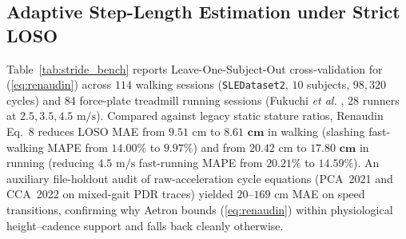 \documentclass[journal]{IEEEtran}
\begin{document}
\subsection{Adaptive Step-Length Estimation under Strict LOSO}
Table~\ref{tab:stride_bench} reports Leave-One-Subject-Out cross-validation for (\ref{eq:renaudin}) across $114$ walking sessions (\texttt{SLEDataset2}, $10$ subjects, $98{,}320$ cycles) and $84$ force-plate treadmill running sessions (Fukuchi \emph{et al.} \cite{fukuchi2017public}, $28$ runners at $2.5, 3.5, 4.5\text{ m/s}$). Compared against legacy static stature ratios, Renaudin Eq.~8 reduces LOSO MAE from $9.51\text{ cm}$ to $\mathbf{8.61\text{ cm}}$ in walking (slashing fast-walking MAPE from $14.00\%$ to $\mathbf{9.97\%}$) and from $20.42\text{ cm}$ to $\mathbf{17.80\text{ cm}}$ in running (reducing $4.5\text{ m/s}$ fast-running MAPE from $20.21\%$ to $\mathbf{14.59\%}$). An auxiliary file-holdout audit of raw-acceleration cycle equations (PCA~2021 and CCA~2022 on mixed-gait PDR traces) yielded $20\text{--}169\text{ cm}$ MAE on speed transitions, confirming why Aetron bounds (\ref{eq:renaudin}) within physiological height--cadence support and falls back cleanly otherwise.

\begin{table}[t]
\centering
\caption{Leave-One-Subject-Out (LOSO) Step-Length Benchmark (SLEDataset2 Walking \& Fukuchi RBDS Running)}
\label{tab:stride_bench}
\renewcommand{\arraystretch}{1.15}
\end{table}
\end{document}
